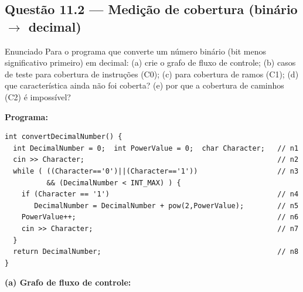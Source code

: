 \documentclass[11pt,a4paper]{article}
\begin{document}
\subsection*{Questão 11.2 — Medição de cobertura (binário $\to$ decimal)}
\begin{questao}{Enunciado}
Para o programa que converte um número binário (bit menos significativo
primeiro) em decimal: (a) crie o grafo de fluxo de controle; (b) casos de teste
para cobertura de instruções (C0); (c) para cobertura de ramos (C1); (d) que
característica ainda não foi coberta? (e) por que a cobertura de caminhos (C2) é
impossível?
\end{questao}
\begin{resposta}
\textbf{Programa:}
\begin{lstlisting}
int convertDecimalNumber() {
  int DecimalNumber = 0;  int PowerValue = 0;  char Character;   // n1
  cin >> Character;                                              // n2
  while ( ((Character=='0')||(Character=='1'))                   // n3
          && (DecimalNumber < INT_MAX) ) {
    if (Character == '1')                                        // n4
       DecimalNumber = DecimalNumber + pow(2,PowerValue);        // n5
    PowerValue++;                                                // n6
    cin >> Character;                                            // n7
  }
  return DecimalNumber;                                          // n8
}
\end{lstlisting}

\textbf{(a) Grafo de fluxo de controle:}
\begin{center}
\end{center}


\end{resposta}
\end{document}
